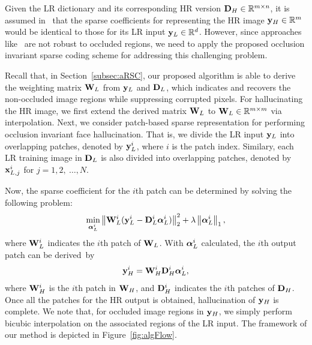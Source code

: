 {Given the LR dictionary and its corresponding HR version $\mathbf{D}_H\in\mathbb{R}^{m\times n}$, it is assumed in~\cite{TIP10,convex} that the sparse coefficients for representing the HR image $\mathbf{y}_H\in\mathbb{R}^m$ would be identical to those for its LR input $\mathbf{y}_L\in\mathbb{R}^d$. However, since approaches like~\cite{TIP10,convex} are not robust to occluded regions, we need to apply the proposed occlusion invariant sparse coding scheme for addressing this challenging problem.

Recall that, in Section~\ref{subsec:aRSC}, our proposed algorithm is able to derive the weighting matrix $\mathbf{W}_L$ from $\mathbf{y}_L$ and $\mathbf{D}_L$, which indicates and recovers the non-occluded image regions while suppressing corrupted pixels. For hallucinating the HR image, we first extend the derived matrix $\mathbf{W}_L$ to $\mathbf{W}_L\in\mathbb{R}^{m\times m}$ via interpolation. Next, we consider patch-based sparse representation for performing occlusion invariant face hallucination. That is, we divide the LR input $\mathbf{y}_L$ into overlapping patches, denoted by $\mathbf{y}_L^i$, where $i$ is the patch index. Similary, each LR training image in $\mathbf{D}_L$ is also divided into overlapping patches, denoted by $\mathbf{x}_{L,j}^i$ for $j=1, 2,~\ldots, N$. 

Now, the sparse coefficient for the $i$th patch can be determined by solving the following problem:
\begin{equation}\label{eqn1}
     \min_{\boldsymbol{\alpha}_L^i} \left\|\mathbf{W}_L^i(\mathbf{y}_L^i - \mathbf{D}_L^i\boldsymbol{\alpha}_L^i) \right\|_2^2+\lambda\left\|\boldsymbol{\alpha}_L^i \right\|_1,
\end{equation}
where $\mathbf{W}_L^i$ indicates the $i$th patch of $\mathbf{W}_L$. With $\boldsymbol{\alpha}_L^i$ calculated, the $i$th output patch can be derived~by
\begin{equation}
\mathbf{y}_H^i = \mathbf{W}_H^i\mathbf{D}_H^i\boldsymbol{\alpha}_L^i,
\end{equation}
where $\mathbf{W}_H^i$ is the $i$th patch in $\mathbf{W}_H$, and $\mathbf{D}_H^i$ indicates the $i$th patches of $\mathbf{D}_H$. Once all the patches for the HR output is obtained, hallucination of $\mathbf{y}_H$ is complete. We note that, for occluded image regions in $\mathbf{y}_H$, we simply perform bicubic interpolation on the associated regions of the LR input. The framework of our method is depicted in Figure~\ref{fig:algFlow}.

}


